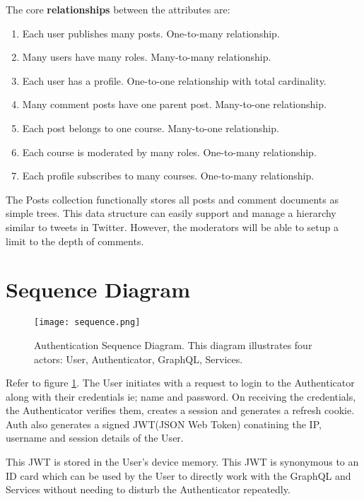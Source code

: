 The core \textbf{relationships} between the attributes are:
\begin{enumerate}
    \item Each user publishes many posts. One-to-many relationship.
    \item Many users have many roles. Many-to-many relationship.
    \item Each user has a profile. One-to-one relationship with total cardinality.
    \item Many comment posts have one parent post. Many-to-one relationship.
    \item Each post belongs to one course. Many-to-one relationship.
    \item Each course is moderated by many roles. One-to-many relationship.
    \item Each profile subscribes to many courses. One-to-many relationship.
\end{enumerate}

The Posts collection functionally stores all posts and comment documents as simple trees. This data structure can easily support 
and manage a hierarchy similar to tweets in Twitter. However, the moderators will be able to setup a limit to the depth of comments.

\section{Sequence Diagram}

\begin{figure}[h!]
    \begin{center}
        \texttt{[image: sequence.png]}
    \end{center}
    \caption{Authentication Sequence Diagram. This diagram illustrates 
    four actors: User, Authenticator, GraphQL, Services.}
    \label{fig:sequence}
\end{figure}

Refer to figure \ref{fig:sequence}.
The User initiates with a request to login to the Authenticator along with their credentials ie; name and password.
On receiving the credentials, the Authenticator verifies them, creates a session and generates a refresh cookie.
Auth also generates a signed JWT(JSON Web Token) conatining the IP, username and session details of the User.

This JWT is stored in the User's device memory. This JWT is synonymous to an ID card which can be used by 
the User to directly work with the GraphQL and Services without needing to disturb the Authenticator repeatedly.

